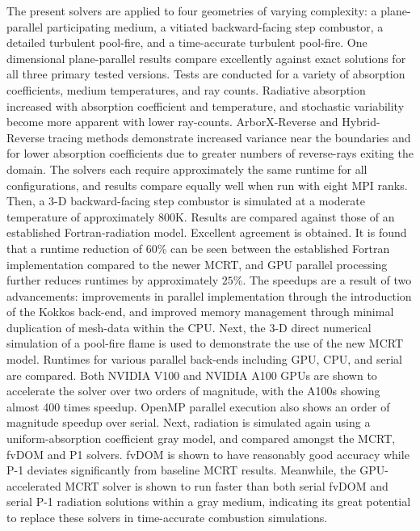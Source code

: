 The present solvers are applied to four geometries of varying complexity: a plane-parallel participating medium, a vitiated backward-facing step combustor, a detailed turbulent pool-fire, and a time-accurate turbulent pool-fire.
One dimensional plane-parallel results compare excellently against exact solutions for all three primary tested versions. Tests are conducted for a variety of absorption coefficients, medium temperatures, and ray counts.
Radiative absorption increased with absorption coefficient and temperature, and stochastic variability become more apparent with lower ray-counts.
ArborX-Reverse and Hybrid-Reverse tracing methods demonstrate increased variance near the boundaries and for lower absorption coefficients due to greater numbers of reverse-rays exiting the domain.
The solvers each require approximately the same runtime for all configurations, and results compare equally well when run with eight MPI ranks.
Then, a 3-D backward-facing step combustor is simulated at a moderate temperature of approximately $800$K. Results are compared against those of an established Fortran-radiation model. Excellent agreement is obtained. It is found that a runtime reduction of $60$\% can be seen between the established Fortran implementation compared to the newer MCRT, and GPU parallel processing further reduces runtimes by approximately $25$\%. The speedups are a result of two advancements: improvements in parallel implementation through the introduction of the Kokkos back-end, and improved memory management through minimal duplication of mesh-data within the CPU.
Next, the 3-D direct numerical simulation of a pool-fire flame is used to demonstrate the use of the new MCRT model. Runtimes for various parallel back-ends including GPU, CPU, and serial are compared. Both NVIDIA V100 and NVIDIA A100 GPUs are shown to accelerate the solver over two orders of magnitude, with the A100s showing almost 400 times speedup. OpenMP parallel execution also shows an order of magnitude speedup over serial. Next, radiation is simulated again using a uniform-absorption coefficient gray model, and compared amongst the MCRT, fvDOM and P1 solvers. fvDOM is shown to have reasonably good accuracy while P-1 deviates significantly from baseline MCRT results. Meanwhile, the GPU-accelerated MCRT solver is shown to run faster than both serial fvDOM and serial P-1 radiation solutions within a gray medium, indicating its great potential to replace these solvers in time-accurate combustion simulations.
